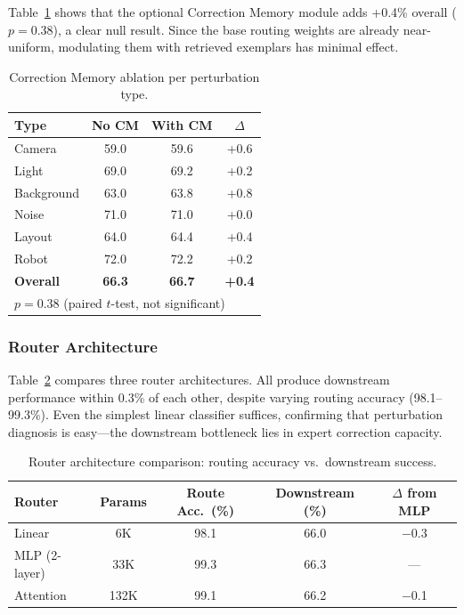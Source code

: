 \documentclass[letterpaper]{article}
\begin{document}
Table~\ref{tab:cm} shows that the optional Correction Memory module adds +0.4\% overall ($p{=}0.38$), a clear null result.
Since the base routing weights are already near-uniform, modulating them with retrieved exemplars has minimal effect.

\begin{table}[h]
\centering
\caption{Correction Memory ablation per perturbation type.}
\label{tab:cm}
\begin{tabular}{lccc}
\toprule
Type & No CM & With CM & $\Delta$ \\
\midrule
Camera & 59.0 & 59.6 & +0.6 \\
Light & 69.0 & 69.2 & +0.2 \\
Background & 63.0 & 63.8 & +0.8 \\
Noise & 71.0 & 71.0 & +0.0 \\
Layout & 64.0 & 64.4 & +0.4 \\
Robot & 72.0 & 72.2 & +0.2 \\
\midrule
\textbf{Overall} & \textbf{66.3} & \textbf{66.7} & \textbf{+0.4} \\
\bottomrule
\multicolumn{4}{l}{\footnotesize $p = 0.38$ (paired $t$-test, not significant)}
\end{tabular}
\end{table}

\subsubsection{Router Architecture}

Table~\ref{tab:router_arch} compares three router architectures.
All produce downstream performance within 0.3\% of each other, despite varying routing accuracy (98.1--99.3\%).
Even the simplest linear classifier suffices, confirming that perturbation diagnosis is easy---the downstream bottleneck lies in expert correction capacity.

\begin{table}[h]
\centering
\caption{Router architecture comparison: routing accuracy vs.\ downstream success.}
\label{tab:router_arch}
\begin{tabular}{lcccc}
\toprule
Router & Params & Route Acc.\ (\%) & Downstream (\%) & $\Delta$ from MLP \\
\midrule
Linear & 6K & 98.1 & 66.0 & $-$0.3 \\
MLP (2-layer) & 33K & 99.3 & 66.3 & --- \\
Attention & 132K & 99.1 & 66.2 & $-$0.1 \\
\bottomrule
\end{tabular}
\end{table}
\end{document}
